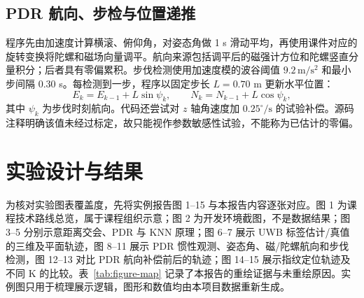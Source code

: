 \subsection{PDR 航向、步检与位置递推}
程序先由加速度计算横滚、俯仰角，对姿态角做 1 s 滑动平均，再使用课件对应的旋转变换将陀螺和磁场向量调平。航向来源包括调平后的磁强计方位和陀螺竖直分量积分；后者具有零偏累积。步伐检测使用加速度模的波谷阈值 $9.2\,\mathrm{m/s^2}$ 和最小步间隔 $0.30$ s。每检测到一步，程序以固定步长 $L=0.70$ m 更新水平位置：
\begin{equation}
 E_k=E_{k-1}+L\sin\psi_k,\qquad
 N_k=N_{k-1}+L\cos\psi_k,
 \label{eq:pdr}
\end{equation}
其中 $\psi_k$ 为步伐时刻航向。代码还尝试对 $z$ 轴角速度加 $0.25^\circ/\mathrm{s}$ 的试验补偿。源码注释明确该值未经过标定，故只能视作参数敏感性试验，不能称为已估计的零偏。

\section{实验设计与结果}
为核对实验图表覆盖度，先将实例报告图 1--15 与本报告内容逐张对应。图 1 为课程技术路线总览，属于课程组织示意；图 2 为开发环境截图，不是数据结果；图 3--5 分别示意距离交会、PDR 与 KNN 原理；图 6--7 展示 UWB 标签估计/真值的三维及平面轨迹，图 8--11 展示 PDR 惯性观测、姿态角、磁/陀螺航向和步伐检测，图 12--13 对比 PDR 航向补偿前后的轨迹；图 14--15 展示指纹定位轨迹及不同 K 的比较。表~\ref{tab:figure-map} 记录了本报告的重绘证据与未重绘原因。实例图只用于梳理展示逻辑，图形和数值均由本项目数据重新生成。

